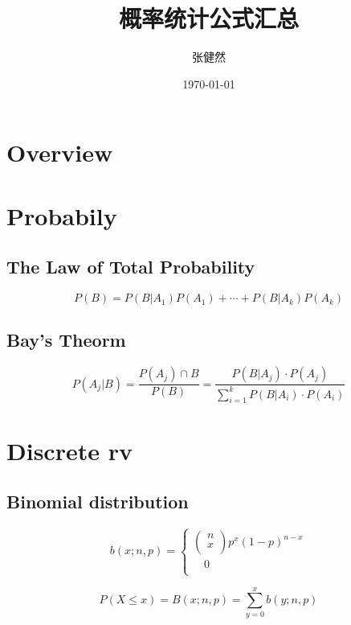 \documentclass[UTF8]{ctexart}
\title{概率统计公式汇总}
\author{\quad 张健然 }
\date{\today}
\numberwithin{equation}{subsection}%
\begin{document}
	\maketitle
	\tableofcontents  %
	\section{Overview}
	\section{Probabily}
	\subsection{The Law of Total Probability}
	\begin{Large}
		\begin{equation}
			P(B)=P(B|A_1)P(A_1)+\cdots+P(B|A_k)P(A_k)
		\end{equation}		
	\end{Large}
    \subsection{Bay's Theorm}
    \begin{Large}
    	\begin{equation}
    		P(A_j|B)=\frac{P(A_j)\cap B}{P(B)}=\frac{P(B|A_j)\cdot P(A_j)}{\sum_{i=1}^{k}P(B|A_i)\cdot P(A_i)}
    	\end{equation}		
    \end{Large}
	\section{Discrete rv}
	\subsection{Binomial distribution}
	\begin{Large}
		\begin{equation}
			b(x;n,p)=\begin{cases}
				\left( \begin{array}{c}
							n\\
							x\\
			           \end{array} \right) p^x(1-p)^{n-x}\\
		          	\quad 0\\
                	\end{cases}
		\end{equation}		
	\end{Large}
	\begin{Large}
		\begin{equation}
			P(X\leqslant x)=B(x;n,p)=\sum_{y=0}^{x}b(y;n,p)
		\end{equation}		
	\end{Large}
\end{document}
